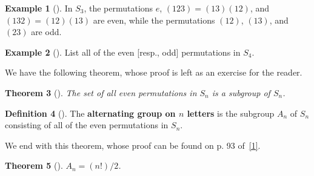 \documentclass[10pt,openany,oneside]{book}
\newcommand{\terminology}[1]{\textbf{#1}}
\theoremstyle{plain}
\newtheorem{theorem}{Theorem}[section]
\theoremstyle{definition}
\newtheorem{definition}[theorem]{Definition}
\theoremstyle{definition}
\theoremstyle{definition}
\newtheorem{example}[theorem]{Example}
\theoremstyle{definition}
\numberwithin{equation}{section}
\begin{document}
\begin{example}[]\label{example-57}
In \(S_3\), the permutations \(e\), \((123)=(13)(12)\), and \((132)=(12)(13)\) are even, while the permutations \((12)\), \((13)\), and \((23)\) are odd.%
\end{example}
\begin{example}[]\label{example-58}
List all of the even [resp., odd] permutations in \(S_4\).%
\end{example}
We have the following theorem, whose proof is left as an exercise for the reader.%
\begin{theorem}[{}]\label{theorem-37}
The set of all even permutations in \(S_n\) is a subgroup of \(S_n\).%
\end{theorem}
\begin{definition}[{}]\label{definition-50}
\label{notation-58}
The \terminology{alternating group on \(n\) letters} is the subgroup \(A_n\) of \(S_n\) consisting of all of the  even permutations in \(S_n\).%
\end{definition}
We end with this theorem, whose proof can be found on p. 93 of~\hyperlink{F}{[1]}.%
\begin{theorem}[{}]\label{theorem-38}
\(A_n=(n!)/2\).%
\end{theorem}
\typeout{************************************************}
\typeout{************************************************}
\end{document}
